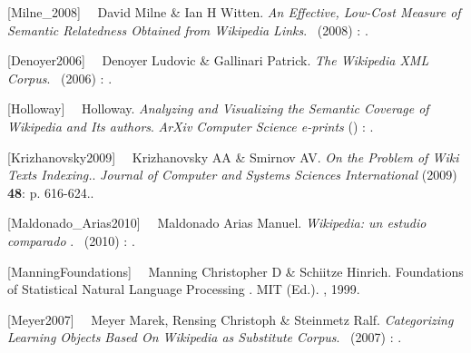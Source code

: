 \documentclass[letterpaper]{article}
\newcommand\textstylebibusindexbase[1]{#1}
\newcommand\textstylebibusindexbasei[1]{\textit{#1}}
\newcommand\textstylebibusindexbaseb[1]{\textbf{#1}}
\begin{document}
{
\textstylebibusindexbase{[Milne\_2008]
}\ \ \textstylebibusindexbase{David Milne \& Ian H Witten.
}\textstylebibusindexbasei{An Effective, Low-Cost Measure of Semantic
Relatedness Obtained from Wikipedia Links}\textstylebibusindexbase{.
}\textstylebibusindexbase{\ (}\textstylebibusindexbase{2008)
}\textstylebibusindexbase{: }\textstylebibusindexbase{.}}

{
\textstylebibusindexbase{[Denoyer2006]
}\ \ \textstylebibusindexbase{Denoyer Ludovic \& Gallinari Patrick.
}\textstylebibusindexbasei{The Wikipedia XML
Corpus}\textstylebibusindexbase{.
}\textstylebibusindexbase{\ (}\textstylebibusindexbase{2006)
}\textstylebibusindexbase{: }\textstylebibusindexbase{.}}

{
\textstylebibusindexbase{[Holloway]
}\ \ \textstylebibusindexbase{Holloway.
}\textstylebibusindexbasei{Analyzing and Visualizing the Semantic
Coverage of Wikipedia and Its authors}\textstylebibusindexbase{.
}\textstylebibusindexbasei{ArXiv Computer Science
e-prints}\textstylebibusindexbase{ (}\textstylebibusindexbase{)
}\textstylebibusindexbase{: }\textstylebibusindexbase{.}}

{
\textstylebibusindexbase{[Krizhanovsky2009]
}\ \ \textstylebibusindexbase{Krizhanovsky AA \& Smirnov AV.
}\textstylebibusindexbasei{On the Problem of Wiki Texts
Indexing.}\textstylebibusindexbase{. }\textstylebibusindexbasei{Journal
of Computer and Systems Sciences
International}\textstylebibusindexbase{ (2009)
}\textstylebibusindexbaseb{48}\textstylebibusindexbase{: p. 616-624..}}

{
\textstylebibusindexbase{[Maldonado\_Arias2010]
}\ \ \textstylebibusindexbase{Maldonado Arias Manuel.
}\textstylebibusindexbasei{Wikipedia: un estudio comparado\newline
}\textstylebibusindexbase{.
}\textstylebibusindexbase{\ (}\textstylebibusindexbase{2010)
}\textstylebibusindexbase{: }\textstylebibusindexbase{.}}

{
\textstylebibusindexbase{[ManningFoundations]
}\ \ \textstylebibusindexbase{Manning Christopher D \& Schiitze
Hinrich. Foundations of Statistical Natural Language Processing\newline
. MIT (Ed.). }\textstylebibusindexbase{,
}\textstylebibusindexbase{1999.}}

{
\textstylebibusindexbase{[Meyer2007] }\ \ \textstylebibusindexbase{Meyer
Marek, Rensing Christoph \& Steinmetz Ralf.
}\textstylebibusindexbasei{Categorizing Learning Objects Based On
Wikipedia as Substitute Corpus}\textstylebibusindexbase{.
}\textstylebibusindexbase{\ (}\textstylebibusindexbase{2007)
}\textstylebibusindexbase{: }\textstylebibusindexbase{.}}
\end{document}
